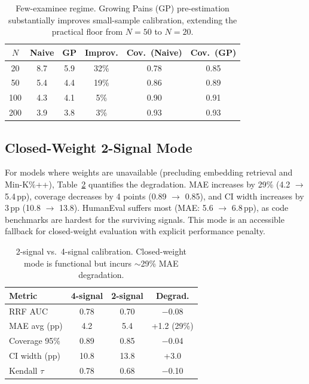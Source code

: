 \documentclass[letterpaper,11pt]{article}
\begin{document}
\begin{table}[t]
\centering
\caption{Few-examinee regime. Growing Pains (GP) pre-estimation substantially improves small-sample calibration, extending the practical floor from $N=50$ to $N=20$.}
\label{tab:few}
\small
\begin{tabular}{cccccc}
\toprule
$N$ & Naive & GP & Improv. & Cov.\ (Naive) & Cov.\ (GP) \\
\midrule
20 & 8.7 & 5.9 & 32\% & 0.78 & 0.85 \\
50 & 5.4 & 4.4 & 19\% & 0.86 & 0.89 \\
100 & 4.3 & 4.1 & 5\% & 0.90 & 0.91 \\
200 & 3.9 & 3.8 & 3\% & 0.93 & 0.93 \\
\bottomrule
\end{tabular}
\end{table}

\subsection{Closed-Weight 2-Signal Mode}
\label{sec:closed_weight}

For models where weights are unavailable (precluding embedding retrieval and Min-K\%++), Table~\ref{tab:2signal} quantifies the degradation. MAE increases by 29\% (4.2 $\to$ 5.4\,pp), coverage decreases by 4 points (0.89 $\to$ 0.85), and CI width increases by 3\,pp (10.8 $\to$ 13.8). HumanEval suffers most (MAE: 5.6 $\to$ 6.8\,pp), as code benchmarks are hardest for the surviving signals. This mode is an accessible fallback for closed-weight evaluation with explicit performance penalty.

\begin{table}[t]
\centering
\caption{2-signal vs.\ 4-signal calibration. Closed-weight mode is functional but incurs $\sim$29\% MAE degradation.}
\label{tab:2signal}
\small
\begin{tabular}{lccc}
\toprule
Metric & 4-signal & 2-signal & Degrad. \\
\midrule
RRF AUC & 0.78 & 0.70 & $-$0.08 \\
MAE avg (pp) & 4.2 & 5.4 & +1.2 (29\%) \\
Coverage 95\% & 0.89 & 0.85 & $-$0.04 \\
CI width (pp) & 10.8 & 13.8 & +3.0 \\
Kendall $\tau$ & 0.78 & 0.68 & $-$0.10 \\
\bottomrule
\end{tabular}
\end{table}
\end{document}
